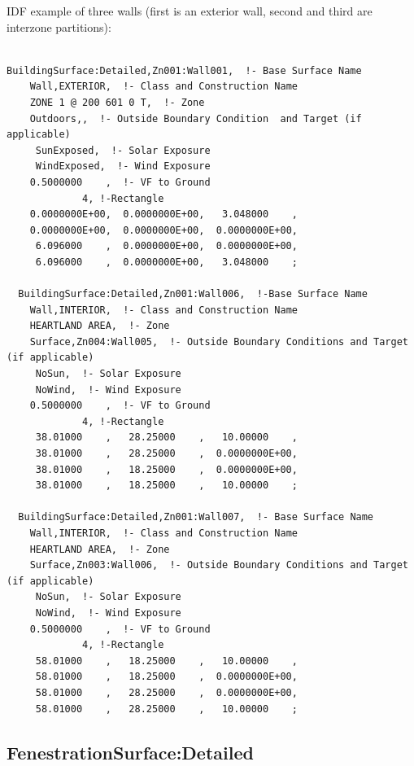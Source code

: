 IDF example of three walls (first is an exterior wall, second and third are interzone partitions):

\begin{lstlisting}

BuildingSurface:Detailed,Zn001:Wall001,  !- Base Surface Name
    Wall,EXTERIOR,  !- Class and Construction Name
    ZONE 1 @ 200 601 0 T,  !- Zone
    Outdoors,,  !- Outside Boundary Condition  and Target (if applicable)
     SunExposed,  !- Solar Exposure
     WindExposed,  !- Wind Exposure
    0.5000000    ,  !- VF to Ground
             4, !-Rectangle
    0.0000000E+00,  0.0000000E+00,   3.048000    ,
    0.0000000E+00,  0.0000000E+00,  0.0000000E+00,
     6.096000    ,  0.0000000E+00,  0.0000000E+00,
     6.096000    ,  0.0000000E+00,   3.048000    ;

  BuildingSurface:Detailed,Zn001:Wall006,  !-Base Surface Name
    Wall,INTERIOR,  !- Class and Construction Name
    HEARTLAND AREA,  !- Zone
    Surface,Zn004:Wall005,  !- Outside Boundary Conditions and Target (if applicable)
     NoSun,  !- Solar Exposure
     NoWind,  !- Wind Exposure
    0.5000000    ,  !- VF to Ground
             4, !-Rectangle
     38.01000    ,   28.25000    ,   10.00000    ,
     38.01000    ,   28.25000    ,  0.0000000E+00,
     38.01000    ,   18.25000    ,  0.0000000E+00,
     38.01000    ,   18.25000    ,   10.00000    ;

  BuildingSurface:Detailed,Zn001:Wall007,  !- Base Surface Name
    Wall,INTERIOR,  !- Class and Construction Name
    HEARTLAND AREA,  !- Zone
    Surface,Zn003:Wall006,  !- Outside Boundary Conditions and Target (if applicable)
     NoSun,  !- Solar Exposure
     NoWind,  !- Wind Exposure
    0.5000000    ,  !- VF to Ground
             4, !-Rectangle
     58.01000    ,   18.25000    ,   10.00000    ,
     58.01000    ,   18.25000    ,  0.0000000E+00,
     58.01000    ,   28.25000    ,  0.0000000E+00,
     58.01000    ,   28.25000    ,   10.00000    ;
\end{lstlisting}

\subsection{FenestrationSurface:Detailed}\label{fenestrationsurfacedetailed}

